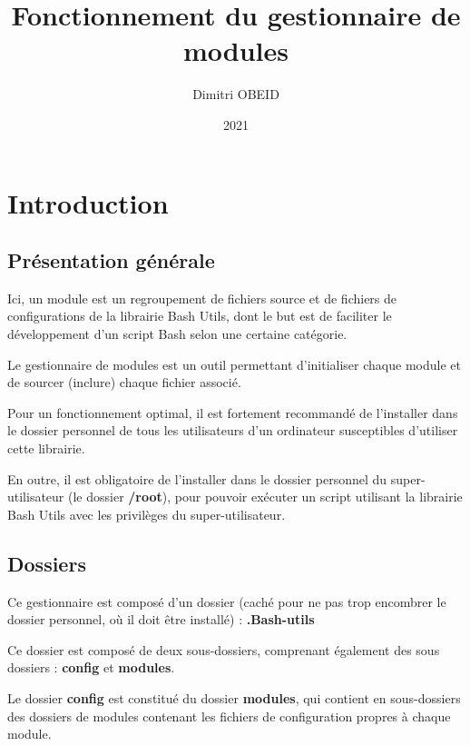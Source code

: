 \documentclass[a4paper,10pt]{article}
\title{\color{red}Fonctionnement du gestionnaire de modules}\color{white}
\author{Dimitri OBEID}
\date{2021}
\begin{document}
 \maketitle
 \tableofcontents
 \newpage

 \color{red}
 \section{Introduction}\color{white}

  \color{green}
  \subsection{Présentation générale}\color{white}
  Ici, un module est un regroupement de fichiers source et de fichiers de configurations de la librairie Bash Utils, dont le but est de faciliter le développement d'un script Bash selon une certaine catégorie.\linebreak

  Le gestionnaire de modules est un outil permettant d'initialiser chaque module et de sourcer (inclure) chaque fichier associé.\linebreak

  Pour un fonctionnement optimal, il est fortement recommandé de l'installer dans le dossier personnel de tous les utilisateurs d'un ordinateur susceptibles d'utiliser cette librairie.\linebreak

  En outre, il est obligatoire de l'installer dans le dossier personnel du super-utilisateur (le dossier \textbf{\color{lime}/root\color{white}}), pour pouvoir exécuter un script utilisant la librairie Bash Utils avec les privilèges du super-utilisateur.

  \color{green}
  \subsection{Dossiers}\color{white}
  Ce gestionnaire est composé d'un dossier (caché pour ne pas trop encombrer le dossier personnel, où il doit être installé) : \textbf{\color{lime}.Bash-utils\color{white}}\linebreak
  
  Ce dossier est composé de deux sous-dossiers, comprenant également des sous dossiers : \textbf{\color{lime}config\color{white}} et \textbf{\color{lime}modules\color{white}}.\linebreak

  Le dossier \textbf{\color{lime}config\color{white}} est constitué du dossier \textbf{\color{lime}modules\color{white}}, qui contient en sous-dossiers des dossiers de modules contenant les fichiers de configuration propres à chaque module.\linebreak
\end{document}
